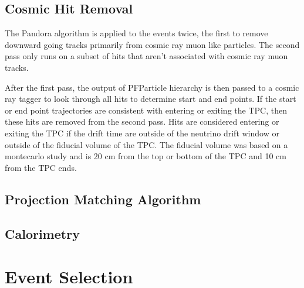 \subsection{Cosmic Hit Removal}
The Pandora algorithm is applied to the events twice, the first to remove downward going tracks primarily from cosmic ray muon like particles. The second pass only runs on a subset of hits that aren't associated with cosmic ray muon tracks. 

After the first pass, the output of PFParticle hierarchy is then passed to a cosmic ray tagger to look through all hits to determine start and end points. If the start or end point trajectories are consistent with entering or exiting the TPC, then these hits are removed from the second pass. Hits are considered entering or exiting the TPC if the drift time are outside of the neutrino drift window or outside of the fiducial volume of the TPC. The fiducial volume was based on a montecarlo study and is 20 cm from the top or bottom of the TPC and 10 cm from the TPC ends.


\subsection{Projection Matching Algorithm}
\subsection{Calorimetry}
\section{Event Selection}

